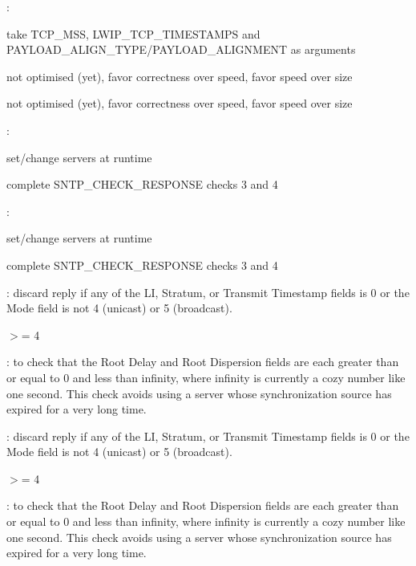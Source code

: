 \begin{DoxyRefList}
\+:
\begin{DoxyItemize}
\item take T\+C\+P\+\_\+\+M\+SS, L\+W\+I\+P\+\_\+\+T\+C\+P\+\_\+\+T\+I\+M\+E\+S\+T\+A\+M\+PS and P\+A\+Y\+L\+O\+A\+D\+\_\+\+A\+L\+I\+G\+N\+\_\+\+T\+Y\+P\+E/\+P\+A\+Y\+L\+O\+A\+D\+\_\+\+A\+L\+I\+G\+N\+M\+E\+NT as arguments  
\end{DoxyItemize}
\item[\label{todo__todo000014}%
\Hypertarget{todo__todo000014}%
File \hyperlink{openmote-cc2538_2lwip_2src_2apps_2snmp_2snmp__asn1_8c}{snmp\+\_\+asn1.c} ]not optimised (yet), favor correctness over speed, favor speed over size  
\item[\label{todo__todo000003}%
\Hypertarget{todo__todo000003}%
File \hyperlink{native_2lwip_2src_2apps_2snmp_2snmp__asn1_8c}{snmp\+\_\+asn1.c} ]not optimised (yet), favor correctness over speed, favor speed over size  
\item[\label{todo__todo000004}%
\Hypertarget{todo__todo000004}%
Module \hyperlink{group__sntp}{sntp} ]\+:
\begin{DoxyItemize}
\item set/change servers at runtime
\item complete S\+N\+T\+P\+\_\+\+C\+H\+E\+C\+K\+\_\+\+R\+E\+S\+P\+O\+N\+SE checks 3 and 4 
\end{DoxyItemize}

\+:
\begin{DoxyItemize}
\item set/change servers at runtime
\item complete S\+N\+T\+P\+\_\+\+C\+H\+E\+C\+K\+\_\+\+R\+E\+S\+P\+O\+N\+SE checks 3 and 4  
\end{DoxyItemize}
\item[\label{todo__todo000010}%
\Hypertarget{todo__todo000010}%
Member \hyperlink{group__sntp__opts_ga7d4e12d90912d486e64f289d7f3ca446}{S\+N\+T\+P\+\_\+\+C\+H\+E\+C\+K\+\_\+\+R\+E\+S\+P\+O\+N\+SE} ]\+: discard reply if any of the LI, Stratum, or Transmit Timestamp fields is 0 or the Mode field is not 4 (unicast) or 5 (broadcast).
\begin{DoxyItemize}
\item $>$= 4 
\end{DoxyItemize}

\+: to check that the Root Delay and Root Dispersion fields are each greater than or equal to 0 and less than infinity, where infinity is currently a cozy number like one second. This check avoids using a server whose synchronization source has expired for a very long time. 

\+: discard reply if any of the LI, Stratum, or Transmit Timestamp fields is 0 or the Mode field is not 4 (unicast) or 5 (broadcast).
\begin{DoxyItemize}
\item $>$= 4 
\end{DoxyItemize}

\+: to check that the Root Delay and Root Dispersion fields are each greater than or equal to 0 and less than infinity, where infinity is currently a cozy number like one second. This check avoids using a server whose synchronization source has expired for a very long time. 
\end{DoxyRefList}